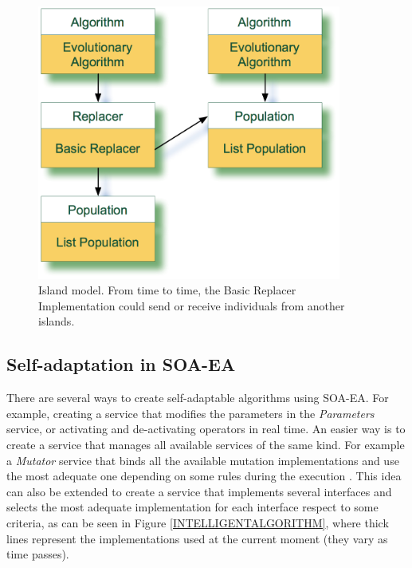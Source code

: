 \begin{figure}
\centering
\includegraphics[width=10cm]{gfx/soaea/island.jpg}
\caption{Island model. From time to time, the Basic Replacer Implementation could send or receive individuals from another islands.}
\label{POPULATION}
\end{figure}



\subsection{Self-adaptation in SOA-EA}
\label{sec:otherexamples}
There are several ways to create self-adaptable algorithms using SOA-EA. For example, creating a service that modifies the parameters in the {\em Parameters} service, or activating and de-activating operators in real time. An easier way is to create a service that manages all available services of the same kind. For example a {\em Mutator} service that binds all the available mutation implementations and use the most adequate one depending on some rules during the execution \cite{SelfadaptationSerpell2010}.  This idea can also be extended to create a service that implements several interfaces and selects the most adequate implementation for each interface respect to some criteria, as can be seen in Figure \ref{INTELLIGENTALGORITHM}, where thick lines represent the implementations used at the current moment (they vary as time passes).



